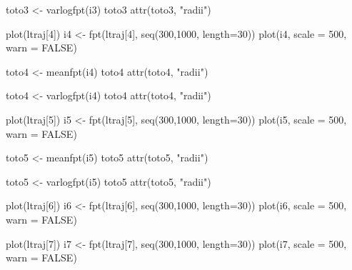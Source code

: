 \documentclass[
  letterpaper,
]{book}
\newenvironment{Shaded}{\begin{snugshade}}{\end{snugshade}}
\newcommand{\AttributeTok}[1]{\textcolor[rgb]{0.40,0.45,0.13}{#1}}
\newcommand{\ConstantTok}[1]{\textcolor[rgb]{0.56,0.35,0.01}{#1}}
\newcommand{\DecValTok}[1]{\textcolor[rgb]{0.68,0.00,0.00}{#1}}
\newcommand{\FunctionTok}[1]{\textcolor[rgb]{0.28,0.35,0.67}{#1}}
\newcommand{\NormalTok}[1]{\textcolor[rgb]{0.00,0.23,0.31}{#1}}
\newcommand{\OtherTok}[1]{\textcolor[rgb]{0.00,0.23,0.31}{#1}}
\newcommand{\StringTok}[1]{\textcolor[rgb]{0.13,0.47,0.30}{#1}}
\begin{document}
\begin{Shaded}
\begin{Highlighting}[]
\NormalTok{toto3 }\OtherTok{\textless{}{-}} \FunctionTok{varlogfpt}\NormalTok{(i3)}
\NormalTok{toto3}
\FunctionTok{attr}\NormalTok{(toto3, }\StringTok{"radii"}\NormalTok{)}

\FunctionTok{plot}\NormalTok{(ltraj[}\DecValTok{4}\NormalTok{])}
\NormalTok{i4 }\OtherTok{\textless{}{-}} \FunctionTok{fpt}\NormalTok{(ltraj[}\DecValTok{4}\NormalTok{], }\FunctionTok{seq}\NormalTok{(}\DecValTok{300}\NormalTok{,}\DecValTok{1000}\NormalTok{, }\AttributeTok{length=}\DecValTok{30}\NormalTok{))}
\FunctionTok{plot}\NormalTok{(i4, }\AttributeTok{scale =} \DecValTok{500}\NormalTok{, }\AttributeTok{warn =} \ConstantTok{FALSE}\NormalTok{)}

\NormalTok{toto4 }\OtherTok{\textless{}{-}} \FunctionTok{meanfpt}\NormalTok{(i4)}
\NormalTok{toto4}
\FunctionTok{attr}\NormalTok{(toto4, }\StringTok{"radii"}\NormalTok{)}

\NormalTok{toto4 }\OtherTok{\textless{}{-}} \FunctionTok{varlogfpt}\NormalTok{(i4)}
\NormalTok{toto4}
\FunctionTok{attr}\NormalTok{(toto4, }\StringTok{"radii"}\NormalTok{)}

\FunctionTok{plot}\NormalTok{(ltraj[}\DecValTok{5}\NormalTok{])}
\NormalTok{i5 }\OtherTok{\textless{}{-}} \FunctionTok{fpt}\NormalTok{(ltraj[}\DecValTok{5}\NormalTok{], }\FunctionTok{seq}\NormalTok{(}\DecValTok{300}\NormalTok{,}\DecValTok{1000}\NormalTok{, }\AttributeTok{length=}\DecValTok{30}\NormalTok{))}
\FunctionTok{plot}\NormalTok{(i5, }\AttributeTok{scale =} \DecValTok{500}\NormalTok{, }\AttributeTok{warn =} \ConstantTok{FALSE}\NormalTok{)}

\NormalTok{toto5 }\OtherTok{\textless{}{-}} \FunctionTok{meanfpt}\NormalTok{(i5)}
\NormalTok{toto5}
\FunctionTok{attr}\NormalTok{(toto5, }\StringTok{"radii"}\NormalTok{)}

\NormalTok{toto5 }\OtherTok{\textless{}{-}} \FunctionTok{varlogfpt}\NormalTok{(i5)}
\NormalTok{toto5}
\FunctionTok{attr}\NormalTok{(toto5, }\StringTok{"radii"}\NormalTok{)}

\FunctionTok{plot}\NormalTok{(ltraj[}\DecValTok{6}\NormalTok{])}
\NormalTok{i6 }\OtherTok{\textless{}{-}} \FunctionTok{fpt}\NormalTok{(ltraj[}\DecValTok{6}\NormalTok{], }\FunctionTok{seq}\NormalTok{(}\DecValTok{300}\NormalTok{,}\DecValTok{1000}\NormalTok{, }\AttributeTok{length=}\DecValTok{30}\NormalTok{))}
\FunctionTok{plot}\NormalTok{(i6, }\AttributeTok{scale =} \DecValTok{500}\NormalTok{, }\AttributeTok{warn =} \ConstantTok{FALSE}\NormalTok{)}

\FunctionTok{plot}\NormalTok{(ltraj[}\DecValTok{7}\NormalTok{])}
\NormalTok{i7 }\OtherTok{\textless{}{-}} \FunctionTok{fpt}\NormalTok{(ltraj[}\DecValTok{7}\NormalTok{], }\FunctionTok{seq}\NormalTok{(}\DecValTok{300}\NormalTok{,}\DecValTok{1000}\NormalTok{, }\AttributeTok{length=}\DecValTok{30}\NormalTok{))}
\FunctionTok{plot}\NormalTok{(i7, }\AttributeTok{scale =} \DecValTok{500}\NormalTok{, }\AttributeTok{warn =} \ConstantTok{FALSE}\NormalTok{)}


\end{Highlighting}
\end{Shaded}
\end{document}

